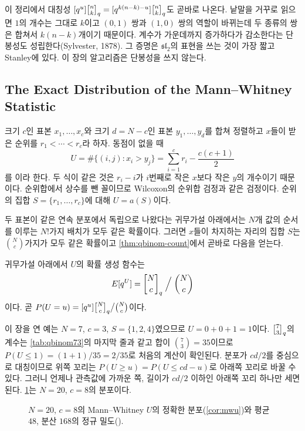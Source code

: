 이 정리에서 대칭성 $[q^u]\qbinom nk=[q^{k(n-k)-u}]\qbinom nk$도 곧바로 나온다. 낱말을 거꾸로 읽으면 $1$의 개수는 그대로 $k$이고 $(0,1)$ 쌍과 $(1,0)$ 쌍의 역할이 바뀌는데 두 종류의 쌍은 합쳐서 $k(n-k)$개이기 때문이다. 계수가 가운데까지 증가하다가 감소한다는 단봉성도 성립한다(Sylvester, 1878). 그 증명은 $\mathfrak{sl}_2$의 표현을 쓰는 것이 가장 짧고 Stanley\cite{stanley2012ec1}에 있다. 이 장의 알고리즘은 단봉성을 쓰지 않는다.

\subsection{The Exact Distribution of the Mann--Whitney Statistic}

크기 $c$인 표본 $x_1,\dots,x_c$와 크기 $d=N-c$인 표본 $y_1,\dots,y_d$를 합쳐 정렬하고 $x$들이 받은 순위를 $r_1<\cdots<r_c$라 하자. 동점이 없을 때
\[
U=\#\{(i,j):x_i>y_j\}=\sum_{i=1}^cr_i-\frac{c(c+1)}2
\]
를 이라 한다\cite{mannwhitney1947}. 두 식이 같은 것은 $r_i-i$가 $i$번째로 작은 $x$보다 작은 $y$의 개수이기 때문이다. 순위합에서 상수를 뺀 꼴이므로 Wilcoxon의 순위합 검정\cite{wilcoxon1945}과 같은 검정이다. 순위의 집합 $S=\{r_1,\dots,r_c\}$에 대해 $U=a(S)$이다.

두 표본이 같은 연속 분포에서 독립으로 나왔다는 귀무가설 아래에서는 $N$개 값의 순서를 이루는 $N!$가지 배치가 모두 같은 확률이다. 그러면 $x$들이 차지하는 자리의 집합 $S$는 $\binom Nc$가지가 모두 같은 확률이고 \cref{thm:qbinom-count}에서 곧바로 다음을 얻는다.

\begin{corollary}
\label{cor:mwu}
귀무가설 아래에서 $U$의 확률 생성 함수는
\[
E[q^U]=\qbinom Nc\Bigm/\binom Nc
\]
이다. 곧 $P(U=u)=[q^u]\qbinom Nc\big/\binom Nc$이다.
\end{corollary}

이 장을 연 예는 $N=7$, $c=3$, $S=\{1,2,4\}$였으므로 $U=0+0+1=1$이다. $\qbinom73$의 계수는 \cref{tab:qbinom73}의 마지막 줄과 같고 합이 $\binom73=35$이므로 $P(U\le1)=(1+1)/35=2/35$로 처음의 계산이 확인된다. 분포가 $cd/2$를 중심으로 대칭이므로 위쪽 꼬리는 $P(U\ge u)=P(U\le cd-u)$로 아래쪽 꼬리로 바꿀 수 있다. 그러니 언제나 관측값에 가까운 쪽, 길이가 $cd/2$ 이하인 아래쪽 꼬리 하나만 세면 된다. \cref{fig:mwu-dist}는 $N=20$, $c=8$의 분포이다.

\begin{figure}[htbp]
\centering
{}
\caption{$N=20$, $c=8$의 Mann--Whitney $U$의 정확한 분포(\cref{cor:mwu})와 평균 $48$, 분산 $168$의 정규 밀도().}
\label{fig:mwu-dist}
\end{figure}

